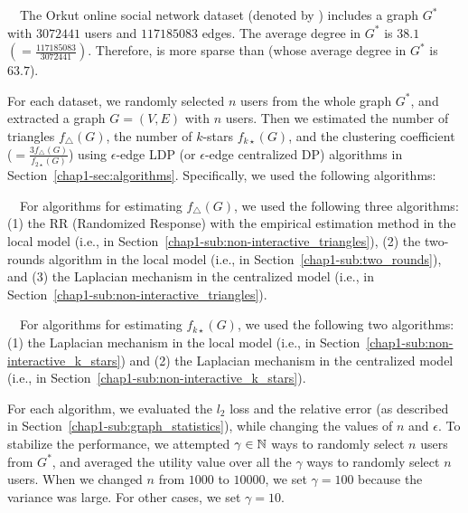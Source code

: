 \smallskip
{}~~The 
Orkut online social network dataset (denoted by \Orkut{})  \cite{snapnets} includes a graph $G^*$ with $3072441$ users and $117185083$ edges. 
The average degree in $G^*$ is $38.1$ $(=\frac{117185083}{3072441})$. 
Therefore, \Orkut{} is more sparse than \IMDB{} (whose average degree in $G^*$ is $63.7$). 

\smallskip
For each dataset, we randomly selected $n$ users from the whole graph $G^*$, and extracted a graph $G=(V,E)$ with 
$n$ users. 
Then we estimated the number of triangles $f_\triangle(G)$, the number of $k$-stars $f_{k\star}(G)$, and the clustering coefficient ($=\frac{3 f_\triangle(G)}{f_{2\star}(G)}$) using $\epsilon$-edge LDP (or $\epsilon$-edge centralized DP) algorithms in Section~\ref{chap1-sec:algorithms}. 
Specifically, we used the following algorithms:

\smallskip
{}~~For algorithms for estimating $f_\triangle(G)$, we used the following three algorithms: 
(1) the RR (Randomized Response) with the empirical estimation method in the local model (i.e.,  in Section~\ref{chap1-sub:non-interactive_triangles}), 
(2) the two-rounds algorithm in the local model (i.e.,  in Section~\ref{chap1-sub:two_rounds}), and 
(3) the Laplacian mechanism in the centralized model (i.e.,  in Section~\ref{chap1-sub:non-interactive_triangles}).

\smallskip
{}~~For algorithms for estimating $f_{k\star}(G)$, we used the following two algorithms: 
(1) the Laplacian mechanism in the local model (i.e.,  in Section~\ref{chap1-sub:non-interactive_k_stars}) and 
(2) the Laplacian mechanism in the centralized model (i.e.,  in Section~\ref{chap1-sub:non-interactive_k_stars}). 

\smallskip
For each algorithm, we evaluated the $l_2$ loss and the relative error (as described in Section~\ref{chap1-sub:graph_statistics}), while changing the values of $n$ and $\epsilon$. 
To stabilize the performance, we attempted $\gamma \in \mathbb{N}$ ways to randomly select $n$ users from $G^*$, and averaged the utility value over all the $\gamma$ ways to randomly select $n$ users. 
When we changed $n$ from $1000$ to $10000$, we set $\gamma = 100$ because the variance was large. For other cases, we set $\gamma = 10$. 

